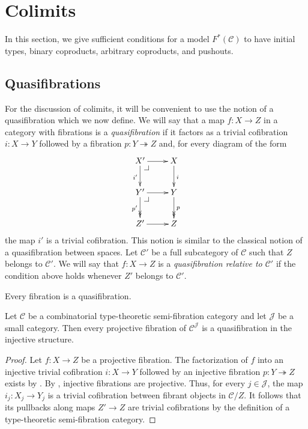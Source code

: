 \documentclass[reqno]{amsart}
\makeatletter
\theoremstyle{definition}
\theoremstyle{remark}
\newcommand{\scat}[1]{\mathcal{#1}}
\numberwithin{figure}{section}
\newcommand{\pb}[1][dr]{\save*!/#1-1.2pc/#1:(-1,1)@^{|-}\restore}
\makeatother
\begin{document}
\section{Colimits}
\label{sec:colimits}

In this section, we give sufficient conditions for a model $F^*(\scat{C})$ to have initial types, binary coproducts, arbitrary coproducts, and pushouts.

\subsection{Quasifibrations}

For the discussion of colimits, it will be convenient to use the notion of a quasifibration which we now define.
We will say that a map $f : X \to Z$ in a category with fibrations is a \emph{quasifibration} if it factors as a trivial cofibration $i : X \to Y$ followed by a fibration $p : Y \twoheadrightarrow Z$ and, for every diagram of the form
\[ \xymatrix{ X' \ar[r] \ar[d]_{i'} \pb         & X \ar[d]^i \\
              Y' \ar[r] \ar@{->>}[d]_{p'} \pb   & Y \ar@{->>}[d]^p \\
              Z' \ar[r]                         & Z
            } \]
the map $i'$ is a trivial cofibration.
This notion is similar to the classical notion of a quasifibration between spaces.
Let $\scat{C}'$ be a full subcategory of $\scat{C}$ such that $Z$ belongs to $\scat{C}'$.
We will say that $f : X \to Z$ is a \emph{quasifibration relative to $\scat{C}'$} if the condition above holds whenever $Z'$ belongs to $\scat{C}'$.

\begin{example}
Every fibration is a quasifibration.
\end{example}

\begin{lem}
Let $\scat{C}$ be a combinatorial type-theoretic semi-fibration category and let $\scat{J}$ be a small category.
Then every projective fibration of $\scat{C}^\scat{J}$ is a quasifibration in the injective structure.
\end{lem}
\begin{proof}
Let $f : X \to Z$ be a projective fibration.
The factorization of $f$ into an injective trivial cofibration $i : X \to Y$ followed by an injective fibration $p : Y \twoheadrightarrow Z$ exists by \cite[Lemma~A.2.8.3]{lurie-topos}.
By , injective fibrations are projective.
Thus, for every $j \in \scat{J}$, the map $i_j : X_j \to Y_j$ is a trivial cofibration between fibrant objects in $\scat{C}/Z$.
It follows that its pullbacks along maps $Z' \to Z$ are trivial cofibrations by the definition of a type-theoretic semi-fibration category.
\end{proof}
\end{document}
